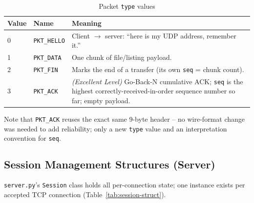 \documentclass[11pt]{article}
\begin{document}
\begin{table}[htbp]
\centering
\caption{Packet \texttt{type} values}
\label{tab:pkt-types}
\begin{tabular}{@{}llp{8.5cm}@{}}
\toprule
\textbf{Value} & \textbf{Name} & \textbf{Meaning} \\
\midrule
0 & \texttt{PKT\_HELLO} & Client $\to$ server: ``here is my UDP address, remember it.'' \\
1 & \texttt{PKT\_DATA}  & One chunk of file/listing payload. \\
2 & \texttt{PKT\_FIN}   & Marks the end of a transfer (its own \texttt{seq} = chunk count). \\
3 & \texttt{PKT\_ACK}   & \textit{(Excellent Level)} Go-Back-N cumulative ACK; \texttt{seq}
                            is the highest correctly-received-in-order sequence number so
                            far; empty payload. \\
\bottomrule
\end{tabular}
\end{table}

Note that \texttt{PKT\_ACK} reuses the exact same 9-byte header -- no wire-format
change was needed to add reliability; only a new \texttt{type} value and an
interpretation convention for \texttt{seq}.

\subsection{Session Management Structures (Server)}

\texttt{server.py}'s \texttt{Session} class holds all per-connection state; one
instance exists per accepted TCP connection (Table~\ref{tab:session-struct}).
\end{document}
